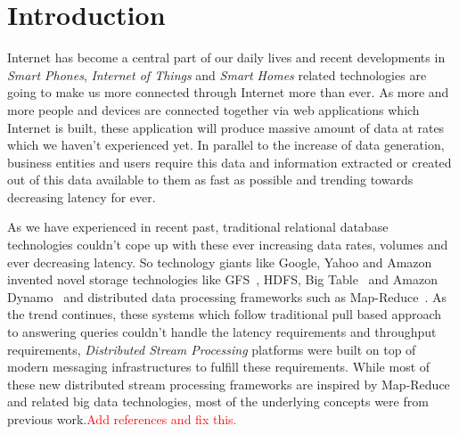 \documentclass{sig-alternate}
\begin{document}


\section{Introduction}
Internet has become a central part of our daily lives and recent developments in
\textit{Smart Phones}, \textit{Internet of Things} and \textit{Smart Homes} related
technologies are going to make us more connected through Internet more than ever.
As more and more people and devices are connected together via web applications which
Internet is built, these application will produce massive amount of data at rates which
we haven't experienced yet. In parallel to the increase of data generation, business
entities and users require this data and information extracted or created out of this data
available to them as fast as possible and trending towards decreasing latency for ever.

\begin{sloppypar}
As we have experienced in recent past, traditional relational database
technologies couldn't
cope up with these ever increasing data rates, volumes and ever decreasing latency. So technology
giants like Google, Yahoo and Amazon invented  novel storage
technologies like GFS~\cite{ghemawat2003google}, HDFS, Big Table~\cite{chang2008bigtable} and
Amazon Dynamo~\cite{decandia2007dynamo} and distributed data processing frameworks such as Map-Reduce~\cite{dean2010mapreduce}.
As the trend continues, these systems which follow traditional pull based approach
to answering queries couldn't handle the latency requirements and throughput requirements,
\textit{Distributed Stream Processing} platforms were built on top of modern messaging
infrastructures to fulfill these requirements. While most of these new
distributed stream processing frameworks are inspired by Map-Reduce
and related big data technologies, most of the underlying concepts
were from previous work.\textcolor{Red}{Add references and fix this.}
\end{sloppypar}
\end{document}
